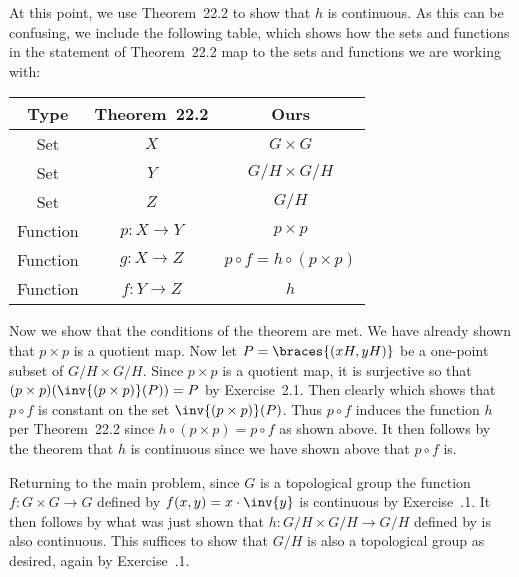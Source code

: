 {{    At this point, we use Theorem~22.2 to show that $h$ is continuous.
    As this can be confusing, we include the following table, which shows how the sets and functions in the statement of Theorem~22.2 map to the sets and functions we are working with:
    \begin{center}
      \begin{tabular}{c|c|c}
        Type & Theorem~22.2 & Ours \\
        \hline
        Set & $X$ & $G \times G$ \\
        Set & $Y$ & $G/H \times G/H$ \\
        Set & $Z$ & $G/H$ \\
        Function & $p: X \to Y$ & $p \times p$ \\
        Function & $g: X \to Z$ & $p \circ f = h \circ (p \times p)$ \\
        Function & $f: Y \to Z$ & $h$
      \end{tabular}
    \end{center}
    Now we show that the conditions of the theorem are met.
    We have already shown that $p \times p$ is a quotient map.
    Now let $P = \braces{(xH, yH)}$ be a one-point subset of $G/H \times G/H$.
    Since $p \times p$ is a quotient map, it is surjective so that $(p \times p)(\inv{(p \times p)}(P)) = P$ by Exercise~2.1.
    Then clearly
    which shows that $p \circ f$ is constant on the set $\inv{(p \times p)}(P)$.
    Thus $p \circ f$ induces the function $h$ per Theorem~22.2 since $h \circ (p \times p) = p \circ f$ as shown above.
    It then follows by the theorem that $h$ is continuous since we have shown above that $p \circ f$ is.

    Returning to the main problem, since $G$ is a topological group the function $f: G \times G \to G$ defined by $f(x,y) = x \cdot \inv{y}$ is continuous by Exercise~\secl.1.
    It then follows by what was just shown that $h : G/H \times G/H \to G/H$ defined by
    is also continuous.
    This suffices to show that $G/H$ is also a topological group as desired, again by Exercise~\secl.1.
  }
}

\renewcommand\thesubsection{\arabic{subsection}}
